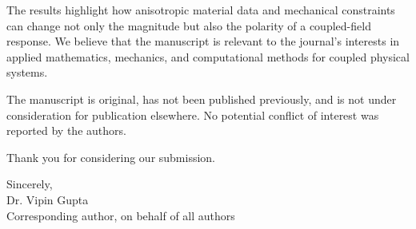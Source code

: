\documentclass[11pt,a4paper]{article}
\begin{document}
The results highlight how anisotropic material data and mechanical constraints can
change not only the magnitude but also the polarity of a coupled-field response. We
believe that the manuscript is relevant to the journal's interests in applied
mathematics, mechanics, and computational methods for coupled physical systems.

The manuscript is original, has not been published previously, and is not under
consideration for publication elsewhere. No potential conflict of interest was
reported by the authors.

Thank you for considering our submission.

Sincerely,\\[2pt]
Dr. Vipin Gupta\\
Corresponding author, on behalf of all authors
\end{document}
